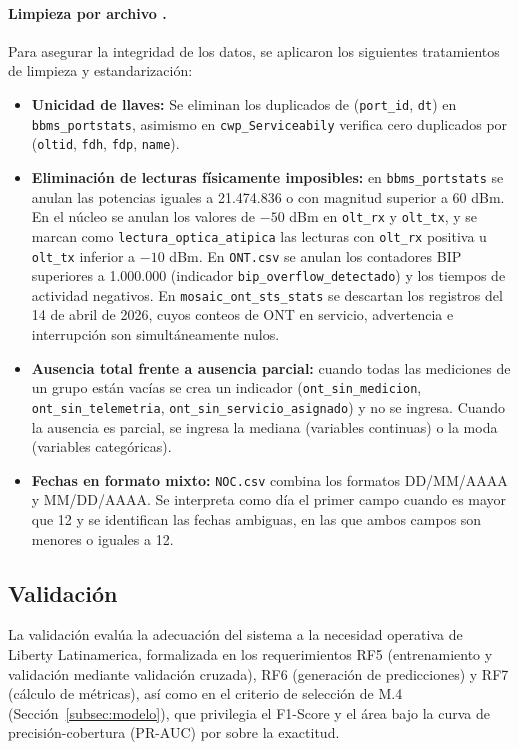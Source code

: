 \documentclass[12pt,a4paper]{article}
\begin{document}
\paragraph{Limpieza por archivo .}
Para asegurar la integridad de los datos, se aplicaron los siguientes tratamientos de limpieza y estandarización:
\begin{itemize}
    \item \textbf{Unicidad de llaves:} Se eliminan los duplicados de  (\texttt{port\_id}, \texttt{dt}) en \texttt{bbms\_portstats}, asimismo en \texttt{cwp\_Serviceabily} verifica cero duplicados por (\texttt{oltid}, \texttt{fdh}, \texttt{fdp}, \texttt{name}). 
    \item \textbf{Eliminación de lecturas físicamente imposibles:} en \texttt{bbms\_portstats} se anulan las potencias iguales a 21.474.836 o con magnitud superior a 60 dBm. En el núcleo se anulan los valores de $-50$ dBm en \texttt{olt\_rx} y \texttt{olt\_tx}, y se marcan como \texttt{lectura\_optica\_atipica} las lecturas con \texttt{olt\_rx} positiva u \texttt{olt\_tx} inferior a $-10$ dBm. En \texttt{ONT.csv} se anulan los contadores BIP superiores a 1.000.000 (indicador \texttt{bip\_overflow\_detectado}) y los tiempos de actividad negativos. En \texttt{mosaic\_ont\_sts\_stats} se descartan los registros del 14 de abril de 2026, cuyos conteos de ONT en servicio, advertencia e interrupción son simultáneamente nulos.
    \item \textbf{Ausencia total frente a ausencia parcial:} cuando todas las mediciones de un grupo están vacías se crea un indicador (\texttt{ont\_sin\_medicion}, \texttt{ont\_sin\_telemetria}, \texttt{ont\_sin\_servicio\_asignado}) y no se ingresa. Cuando la ausencia es parcial, se ingresa la mediana (variables continuas) o la moda (variables categóricas).
    \item \textbf{Fechas en formato mixto:} \texttt{NOC.csv} combina los formatos DD/MM/AAAA y MM/DD/AAAA. Se interpreta como día el primer campo cuando es mayor que 12 y se identifican las fechas ambiguas, en las que ambos campos son menores o iguales a 12.
\end{itemize}


\subsection{Validación}
\label{subsec:validacion}
\noindent
La validación evalúa la adecuación del sistema a la necesidad operativa de Liberty Latinamerica,
 formalizada en los requerimientos RF5 (entrenamiento y validación mediante validación cruzada),
  RF6 (generación de predicciones) y RF7 (cálculo de métricas), así como en el criterio de selección de M.4
   (Sección~\ref{subsec:modelo}), que privilegia el F1-Score y el área bajo la curva de precisión-cobertura (PR-AUC) 
   por sobre la exactitud.
\end{document}
